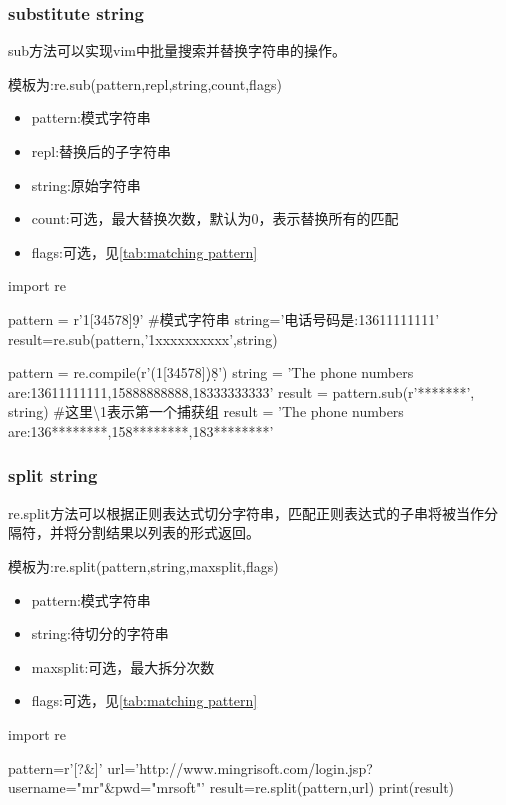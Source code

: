   \subsubsection{substitute string}
    sub方法可以实现vim中批量搜索并替换字符串的操作。

    模板为:re.sub(pattern,repl,string,count,flags)
    \begin{itemize}
      \item pattern:模式字符串
      \item repl:替换后的子字符串
      \item string:原始字符串
      \item count:可选，最大替换次数，默认为0，表示替换所有的匹配
      \item flags:可选，见\autoref{tab:matching pattern}
    \end{itemize}

    \begin{codeblock}[language=python, caption={string substitution}]
      import re

      pattern = r'1[34578]\d{9}' #模式字符串
      string='电话号码是:13611111111'
      result=re.sub(pattern,'1xxxxxxxxxx',string)

      pattern = re.compile(r'(1[34578]\d)\d{8}')
      string = 'The phone numbers are:13611111111,15888888888,18333333333'
      result = pattern.sub(r'\1********', string) #这里\textbackslash 1表示第一个捕获组
      result = 'The phone numbers are:136********,158********,183********'
    \end{codeblock}

  \subsubsection{split string}
    re.split方法可以根据正则表达式切分字符串，匹配正则表达式的子串将被当作分隔符，并将分割结果以列表的形式返回。

    模板为:re.split(pattern,string,\lbrack maxsplit\rbrack,\lbrack flags\rbrack)
    \begin{itemize}
      \item pattern:模式字符串
      \item string:待切分的字符串
      \item maxsplit:可选，最大拆分次数
      \item flags:可选，见\autoref{tab:matching pattern}
    \end{itemize}
    \begin{codeblock}[language=python, caption={string segmentation}]
      import re

      pattern=r'[?&]'
      url='http://www.mingrisoft.com/login.jsp?username="mr"&pwd="mrsoft"'
      result=re.split(pattern,url)
      print(result)
    \end{codeblock}

